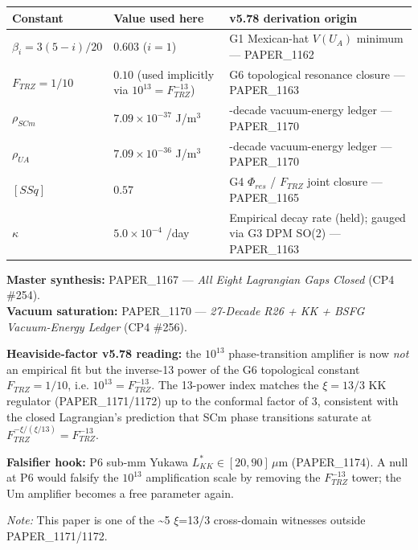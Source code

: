 \documentclass[12pt,a4paper]{article}
\begin{document}
\begin{table}[H]
\centering
\small
\begin{tabularx}{\linewidth}{@{}>{\raggedright\arraybackslash}X>{\raggedright\arraybackslash}X>{\raggedright\arraybackslash}X@{}}
\toprule
Constant & Value used here & v5.78 derivation origin \tabularnewline
\midrule
$\beta_i = 3(5-i)/20$ & $0.603$ ($i=1$) & G1 Mexican-hat $V(U_A)$ minimum --- PAPER\_1162 \tabularnewline
$F_{TRZ} = 1/10$ & $0.10$ (used implicitly via $10^{13} = F_{TRZ}^{-13}$) & G6 topological resonance closure --- PAPER\_1163 \tabularnewline
$\rho_{SCm}$ & $7.09\times10^{-37}$ J/m$^{3}$ & 27-decade vacuum-energy ledger --- PAPER\_1170 \tabularnewline
$\rho_{UA}$ & $7.09\times10^{-36}$ J/m$^{3}$ & 27-decade vacuum-energy ledger --- PAPER\_1170 \tabularnewline
$[SSq]$ & $0.57$ & G4 $\Phi_{res}$ / $F_{TRZ}$ joint closure --- PAPER\_1165 \tabularnewline
$\kappa$ & $5.0\times10^{-4}$ /day & Empirical decay rate (held); gauged via G3 DPM SO(2) --- PAPER\_1163 \tabularnewline
\bottomrule
\end{tabularx}
\end{table}

\begin{flushleft}
\textbf{Master synthesis:} PAPER\_1167 --- \emph{All Eight Lagrangian Gaps Closed} (CP4 \#254). \\
\textbf{Vacuum saturation:} PAPER\_1170 --- \emph{27-Decade R26 + KK + BSFG Vacuum-Energy Ledger} (CP4 \#256). \\
\end{flushleft}

\textbf{Heaviside-factor v5.78 reading:} the $10^{13}$ phase-transition amplifier is now \emph{not} an empirical fit but the inverse-13 power of the G6 topological constant $F_{TRZ}=1/10$, i.e. $10^{13} = F_{TRZ}^{-13}$. The 13-power index matches the $\xi=13/3$ KK regulator (PAPER\_1171/1172) up to the conformal factor of 3, consistent with the closed Lagrangian's prediction that SCm phase transitions saturate at $F_{TRZ}^{-\xi/(\xi/13)} = F_{TRZ}^{-13}$.

\textbf{Falsifier hook:} P6 sub-mm Yukawa $L_{KK}^* \in [20,90]\,\mu\mathrm{m}$ (PAPER\_1174). A null at P6 would falsify the $10^{13}$ amplification scale by removing the $F_{TRZ}^{-13}$ tower; the Um amplifier becomes a free parameter again.

\emph{Note:} This paper is one of the \textasciitilde{}5 $\xi$=13/3 cross-domain witnesses outside PAPER\_1171/1172.
\end{document}
